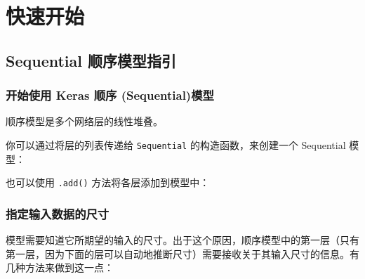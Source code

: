 \section{快速开始}
\subsection{Sequential 顺序模型指引}\label{sequential-model-guide}
\subsubsection{开始使用 Keras 顺序 (Sequential)模型}

顺序模型是多个网络层的线性堆叠。

你可以通过将层的列表传递给 \texttt{Sequential} 的构造函数，来创建一个
Sequential 模型：

\begin{Shaded}
\begin{Highlighting}[]
  
  

\OperatorTok{=} \NormalTok{Sequential([}
    \OperatorTok{=}\NormalTok{(}\NormalTok{,)),}
    \NormalTok{),}
    \NormalTok{),}
    \NormalTok{),}
\NormalTok{])}
\end{Highlighting}
\end{Shaded}

也可以使用 \texttt{.add()} 方法将各层添加到模型中：

\begin{Shaded}
\begin{Highlighting}[]
\OperatorTok{=} 
\OperatorTok{=}\NormalTok{))}
\NormalTok{))}
\end{Highlighting}
\end{Shaded}


\subsubsection{指定输入数据的尺寸}

模型需要知道它所期望的输入的尺寸。出于这个原因，顺序模型中的第一层（只有第一层，因为下面的层可以自动地推断尺寸）需要接收关于其输入尺寸的信息。有几种方法来做到这一点：

